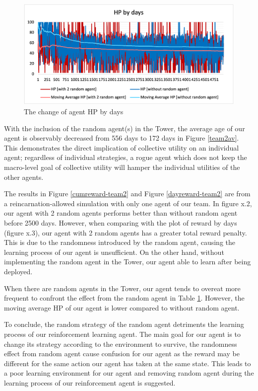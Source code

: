 \begin{figure}
\centering
\includegraphics{004_team_2_agent_design/hpchange}
\caption{The change of agent HP by days}
\label{hpchange-team2}
\end{figure}

With the inclusion of the random agent(s) in the Tower, the average age of our agent is observably decreased from 556 days to 172 days in Figure \ref{team2av}. This demonstrates the direct implication of collective utility on an individual agent; regardless of individual strategies, a rogue agent which does not keep the macro-level goal of collective utility will hamper the individual utilities of the other agents. 

The results in Figure \ref{cumreward-team2} and Figure \ref{dayreward-team2} are from a reincarnation-allowed simulation with only one agent of our team. In figure x.2, our agent with 2 random agents performs better than without random agent before 2500 days. However, when comparing with the plot of reward by days (figure x.3), our agent with 2 random agents has a greater total reward penalty. This is due to the randomness introduced by the random agent, causing the learning process of our agent is unsufficient. On the other hand, without implementing the random agent in the Tower, our agent able to learn after being deployed.

When there are random agents in the Tower, our agent tends to overeat more frequent to confront the effect from the random agent in Table \ref{hpchange-team2}. However, the moving average HP of our agent is lower compared to without random agent.

To conclude, the random strategy of the random agent detriments the learning process of our reinforcement learning agent. The main goal for our agent is to change its strategy according to the environment to survive, the randomness effect from random agent cause confusion for our agent as the reward may be different for the same action our agent has taken at the same state. This leads to a poor learning environment for our agent and removing random agent during the learning process of our reinforcement agent is suggested.

